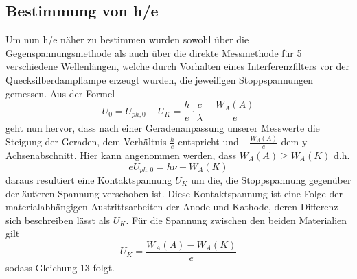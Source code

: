 \documentclass{scrartcl}
\begin{document}
	\subsection{Bestimmung von h/e}
		Um nun h/e näher zu bestimmen wurden sowohl über die Gegenspannungsmethode als auch über die direkte Messmethode
		für 5 verschiedene Wellenlängen, welche durch Vorhalten eines Interferenzfilters vor der Quecksilberdampflampe erzeugt wurden,
		die jeweiligen Stoppspannungen gemessen. Aus der Formel
		\begin{equation}
			U_0 = U_{ph,0} - U_K = \frac{h}{e}\cdot \frac{c}{\lambda} - \frac{W_A(A)}{e}
		\end{equation}
		geht nun hervor, dass nach einer Geradenanpassung unserer Messwerte die Steigung der Geraden, dem Verhältnis
		$\frac{h}{e}$ entspricht und $-\frac{W_A(A)}{e}$ dem y-Achsenabschnitt.
		Hier kann angenommen werden, dass $W_A(A)\geq W_A(K)$ d.h.
		\begin{equation}
			eU_{ph,0} = h\nu - W_A(K)
		\end{equation} 
		daraus resultiert eine Kontaktspannung $U_K$ um die, die Stoppspannung gegenüber der äußeren Spannung verschoben ist. Diese Kontaktspannung
		ist eine Folge der materialabhängigen Austrittsarbeiten der Anode und Kathode, deren Differenz sich beschreiben lässt als $U_K$. Für die Spannung zwischen den beiden Materialien gilt
		\begin{equation}
			U_K = \frac{W_A(A)-W_A(K)}{e}
		\end{equation}
		sodass Gleichung 13 folgt.
\end{document}
